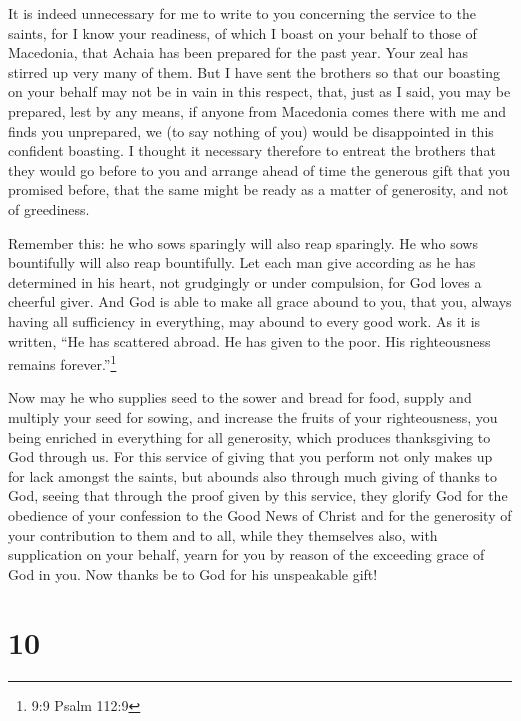  It is indeed unnecessary for me to write to you concerning
the service to the saints,  for I know your readiness, of
which I boast on your behalf to those of Macedonia, that Achaia has been
prepared for the past year. Your zeal has stirred up very many of them.
 But I have sent the brothers so that our boasting on your
behalf may not be in vain in this respect, that, just as I said, you may
be prepared,  lest by any means, if anyone from Macedonia
comes there with me and finds you unprepared, we (to say nothing of you)
would be disappointed in this confident boasting.  I thought
it necessary therefore to entreat the brothers that they would go before
to you and arrange ahead of time the generous gift that you promised
before, that the same might be ready as a matter of generosity, and not
of greediness.

 Remember this: he who sows sparingly will also reap
sparingly. He who sows bountifully will also reap bountifully.
 Let each man give according as he has determined in his
heart, not grudgingly or under compulsion, for God loves a cheerful
giver.  And God is able to make all grace abound to you,
that you, always having all sufficiency in everything, may abound to
every good work.  As it is written, ``He has scattered
abroad. He has given to the poor. His righteousness remains
forever.''\footnote{9:9 Psalm 112:9}

 Now may he who supplies seed to the sower and bread for
food, supply and multiply your seed for sowing, and increase the fruits
of your righteousness,  you being enriched in everything
for all generosity, which produces thanksgiving to God through us.
 For this service of giving that you perform not only makes
up for lack amongst the saints, but abounds also through much giving of
thanks to God,  seeing that through the proof given by this
service, they glorify God for the obedience of your confession to the
Good News of Christ and for the generosity of your contribution to them
and to all,  while they themselves also, with supplication
on your behalf, yearn for you by reason of the exceeding grace of God in
you.  Now thanks be to God for his unspeakable gift!

\hypertarget{section-9}{%
\section{10}\label{section-9}}

